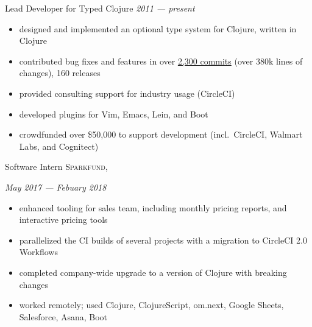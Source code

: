 \documentclass[10pt,a4paper]{article}
\begin{document}
\spacedhrule{0em}{-0.4em}


\headedsection
  {Lead Developer for Typed Clojure}
  {\textit{2011 --- present}}
  {
  \begin{itemize}
    \item designed and implemented an optional type system for Clojure, written in Clojure
    \item contributed bug fixes and features in over \href{https://github.com/clojure/core.typed/graphs/contributors}{2,300 commits} (over 380k lines of changes), 160 releases
    \item provided consulting support for industry usage (CircleCI)
    \item developed plugins for Vim, Emacs, Lein, and Boot
    \item crowdfunded over \$50,000 to support development (incl.~CircleCI, Walmart Labs, 
      and Cognitect)
  \end{itemize}
  }

\headedsection
  {Software Intern}
  {\textsc{Sparkfund, }}
  {%
      {\textit{May 2017 --- Febuary 2018}}
      {%
      \begin{itemize}
        \item enhanced tooling for sales team, including
              monthly pricing reports, and interactive pricing tools
        \item parallelized the CI builds of several projects with a migration to CircleCI 2.0 Workflows
        \item completed company-wide upgrade to a version of Clojure with breaking changes
        \item worked remotely; used Clojure, ClojureScript, om.next, Google Sheets, Salesforce, Asana, Boot
      \end{itemize}
      }%
  }
\end{document}
